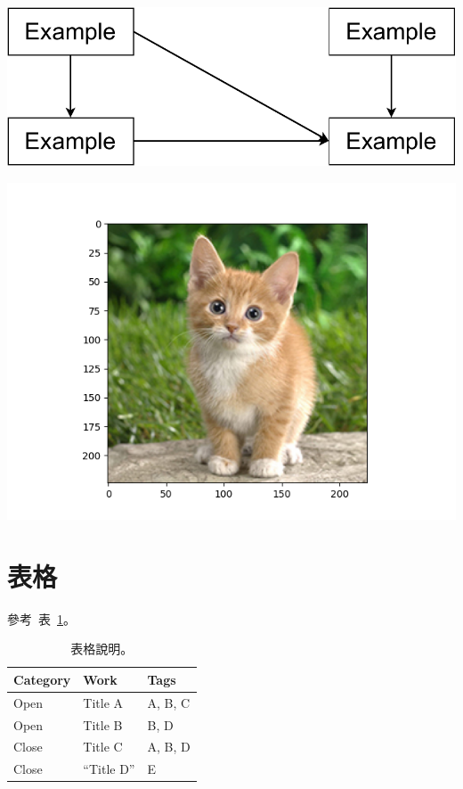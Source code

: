 \documentclass[12pt, a4paper]{article}
\newcommand{\noncopynumber}[1]{%
    \BeginAccSupp{method=escape,ActualText={}}%
    #1%
    \EndAccSupp{}%
}
\newcommand\pythonstyle{\lstset{%
language=Python,%
basicstyle=\Iosevka,%
morekeywords={self,with},%
keywordstyle=\IosevkaBold\color{BlueViolet},%
emph={MyClass,__init__},%
emphstyle=\IosevkaBold\color{BrickRed},%
stringstyle=\color{ForestGreen},%
frame=single,%
showstringspaces=false,%
showspaces=true,%
commentstyle=\IosevkaItalic\color{Gray},%
morecomment=[l][\IosevkaItalic\color{Gray}]{\#},%
numbers=left,%
stepnumber=1,%
literate={-}{-}1,%
columns=fullflexible,%
numberstyle=\footnotesize\noncopynumber,%
mathescape=true,%
}}
\newcommand\pythoninlinebg[1]{%
\tcbox[colback=MyGreyBG]{{\pythonstyle\lstinline[breaklines=false]{#1}}}%
}
\renewcommand{\tablename}{表}
\newcommand{\Table}[1]{\tablename~#1}
\begin{document}
\begin{table}[t]
    \centering
    \begin{minipage}[t]{.48\linewidth}
        \includegraphics[width=\linewidth]{figures/paper-example.pdf}
        \label{fig:A}
    \end{minipage}
    \qquad
    \begin{minipage}[t]{.44\linewidth}
        \includegraphics[width=\linewidth]{figures/cat.png}
        \label{fig:B}
    \end{minipage}
\end{table}

\section{表格}

參考~\Table{\ref{tab:example}}。

\begin{table}[t]
    \centering
    \caption{表格說明。}\label{tab:example}
    \begin{tabular}{lll}
    \toprule
    \textbf{Category} & \textbf{Work} & \textbf{Tags} \\
    \midrule
        Open     &   Title A   &   A, B, C   \\
        Open     &   Title B   &  B, D    \\
        Close     &   Title C   &  A, B, D    \\
        Close     &   ``Title D''   &  E \pythoninlinebg{TestClass}   \\
    \bottomrule
    \end{tabular}
\end{table}

\FloatBarrier
\renewcommand*{\bibfont}{\small}
\printbibliography[
    heading=bibintoc,
    title={參考文獻}
]
\end{document}
